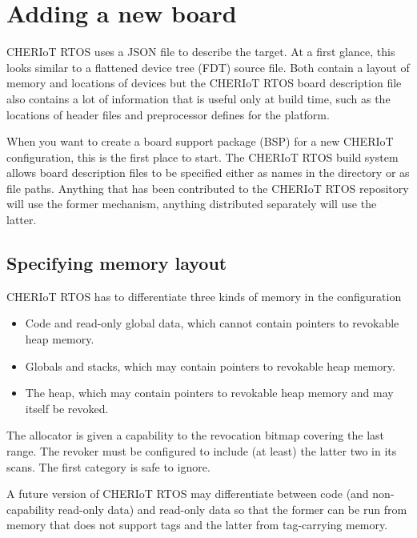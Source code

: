\chapter[label=new_board]{Adding a new board}

CHERIoT RTOS uses a JSON file to describe the target.
At a first glance, this looks similar to a flattened device tree (FDT) source file.
Both contain a layout of memory and locations of devices but the CHERIoT RTOS board description file also contains a lot of information that is useful only at build time, such as the locations of header files and preprocessor defines for the platform.

When you want to create a board support package (BSP) for a new CHERIoT configuration, this is the first place to start.
The CHERIoT RTOS build system allows board description files to be specified either as names in the  directory or as file paths.
Anything that has been contributed to the CHERIoT RTOS repository will use the former mechanism, anything distributed separately will use the latter.

\section{Specifying memory layout}

CHERIoT RTOS has to differentiate three kinds of memory in the configuration

\begin{itemize}
	\item{Code and read-only global data, which cannot contain pointers to revokable heap memory.}
	\item{Globals and stacks, which may contain pointers to revokable heap memory.}
	\item{The heap, which may contain pointers to revokable heap memory and may itself be revoked.}
\end{itemize}

The allocator is given a capability to the revocation bitmap covering the last range.
The revoker must be configured to include (at least) the latter two in its scans.
The first category is safe to ignore.

\begin{note}
A future version of CHERIoT RTOS may differentiate between code (and non-capability read-only data) and read-only data so that the former can be run from memory that does not support tags and the latter from tag-carrying memory.
\end{note}


